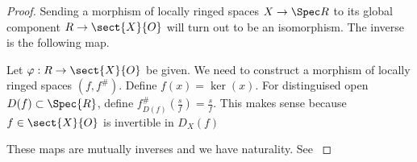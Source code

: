 
\begin{proof}
Sending a morphism of locally ringed spaces $X \rightarrow \Spec R$ to its global component $R \rightarrow \sect{X}{O}$
will turn out to be an isomorphism.
The inverse is the following map. 

Let $\varphi: R \rightarrow \sect{X}{O}$ be given.
We need to construct a morphism of locally ringed spaces $(f,f^{\#})$.
Define $f(x) = \ker(x)$.
For distinguised open $D(f)\subset \Spec{R}$,
define $f^{\#}_{D(f)}(\frac{s}{f}) = \frac{s}{f}$.
This makes sense because $f \in \sect{X}{O}$ is invertible in $D_X(f)$

These maps are mutually inverses and we have naturality.
See \cite[Tag 01I1]{stacks}
\end{proof}